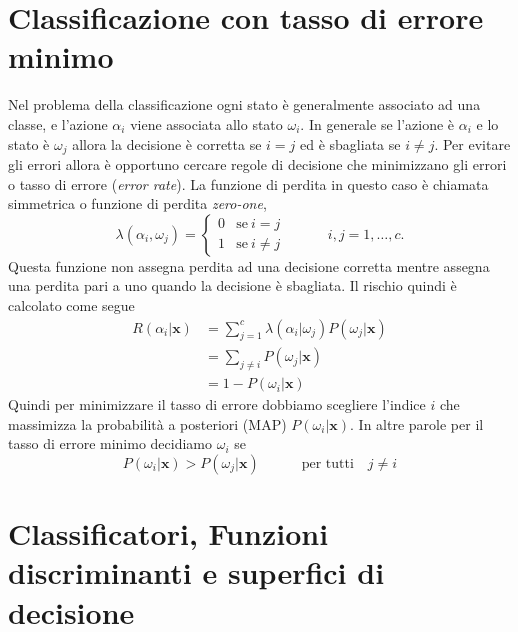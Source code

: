 \section{Classificazione con tasso di errore minimo}
Nel problema della classificazione ogni stato è generalmente associato ad una classe, e l'azione $\alpha_i$ viene associata allo stato $\omega_i$. In generale se l'azione è $\alpha_i$ e lo stato è $\omega_j$ allora la decisione è corretta se $i = j$ ed è sbagliata se $i \neq j$. Per evitare gli errori allora è opportuno cercare regole di decisione che minimizzano gli errori o tasso di errore (\emph{error rate}). La funzione di perdita in questo caso è chiamata simmetrica o funzione di perdita \emph{zero-one},
\[
\lambda(\alpha_i, \omega_j)=
\begin{cases}
0 & \text{se} \ i = j\\
1 & \text{se} \ i \neq j 
\end{cases} 
\quad \quad \quad
i,j = 1, \dots, c.
\]
Questa funzione non assegna perdita ad una decisione corretta mentre assegna una perdita pari a uno quando la decisione è sbagliata. Il rischio quindi è calcolato come segue
\begin{equation}
\begin{split}
R(\alpha_i | \mathbf{x}) &= \sum_{j=1}^c \lambda(\alpha_i | \omega_j ) P(\omega_j | \mathbf{x}) \\
&= \sum_{j \neq i} P(\omega_j | \mathbf{x})\\
&= 1 - P(\omega_i | \mathbf{x})
\end{split}
\end{equation}
Quindi per minimizzare il tasso di errore dobbiamo scegliere l'indice $i$ che massimizza la probabilità a posteriori (MAP) $P(\omega_i | \mathbf{x})$. In altre parole per il tasso di errore minimo decidiamo $\omega_i$ se
\begin{equation}
P(\omega_i | \mathbf{x}) > P(\omega_j | \mathbf{x}) \quad \quad \quad \text{per tutti} \quad  j \neq i
\end{equation}

\section{Classificatori, Funzioni discriminanti e superfici di decisione}
